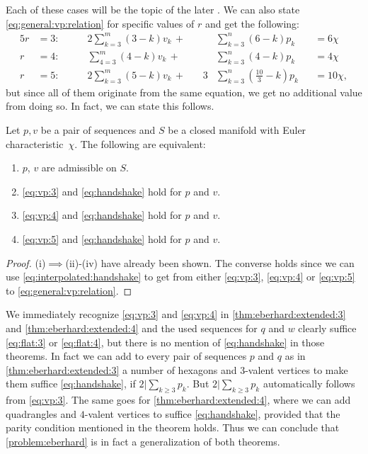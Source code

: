 Each of these cases will be the topic of the later . We can also state \eqref{eq:general:vp:relation} for specific values of $r$ and get the following:
\begin{alignat}{5}
  r &= 3: \qquad &2 \sum_{k=3}^m \left(3 - k \right) v_k\,+\, &&  & \sum_{k=3}^n \left(6 - k \right) p_k &&= 6 \chi \label{eq:vp:3}\\
  r &= 4: \qquad &  \sum_{4=3}^m \left(4 - k \right) v_k\,+\, &&  & \sum_{k=3}^n \left(4 - k \right) p_k &&= 4 \chi  \label{eq:vp:4}\\
  r &= 5: \qquad &2 \sum_{k=3}^m \left(5 - k \right) v_k\,+\, &&3 & \sum_{k=3}^n \left( \tfrac{10}{3} - k \right) p_k &&= 10 \chi, \label{eq:vp:5}
\end{alignat}
but since all of them originate from the same equation, we get no additional value from doing so. In fact, we can state this follows.
\begin{lemma}
  Let $p, v$ be a pair of sequences and $S$ be a closed manifold with {\sc Euler} characteristic~$\chi$. The following are equivalent:
  \begin{enumerate}[label=(\roman*)]
    \item $p$, $v$ are admissible on $S$.
    \item \eqref{eq:vp:3} and \eqref{eq:handshake} hold for $p$ and $v$.
    \item \eqref{eq:vp:4} and \eqref{eq:handshake} hold for $p$ and $v$.
    \item \eqref{eq:vp:5} and \eqref{eq:handshake} hold for $p$ and $v$.
  \end{enumerate}
  \begin{proof} (i)$\implies$(ii)-(iv) have already been shown. The converse holds since we can use \eqref{eq:interpolated:handshake} to get from either \eqref{eq:vp:3}, \eqref{eq:vp:4} or \eqref{eq:vp:5} to \eqref{eq:general:vp:relation}.
  \end{proof}
\end{lemma}

\begin{remark}
  We immediately recognize \eqref{eq:vp:3} and \eqref{eq:vp:4} in \autoref{thm:eberhard:extended:3} and \autoref{thm:eberhard:extended:4} and the used sequences for $q$ and $w$ clearly suffice \eqref{eq:flat:3} or \eqref{eq:flat:4}, but there is no mention of \eqref{eq:handshake} in those theorems. In fact we can add to every pair of sequences $p$ and $q$ as in \autoref{thm:eberhard:extended:3} a number of hexagons and $3$-valent vertices to make them suffice \eqref{eq:handshake}, if $2 | \sum_{k \geq 3} p_k$. But $2 | \sum_{k \geq 3} p_k$ automatically follows from \eqref{eq:vp:3}. The same goes for \autoref{thm:eberhard:extended:4}, where we can add quadrangles and $4$-valent vertices to suffice \eqref{eq:handshake}, provided that the parity condition mentioned in the theorem holds. Thus we can conclude that \autoref{problem:eberhard} is in fact a generalization of both theorems. 
\end{remark}

